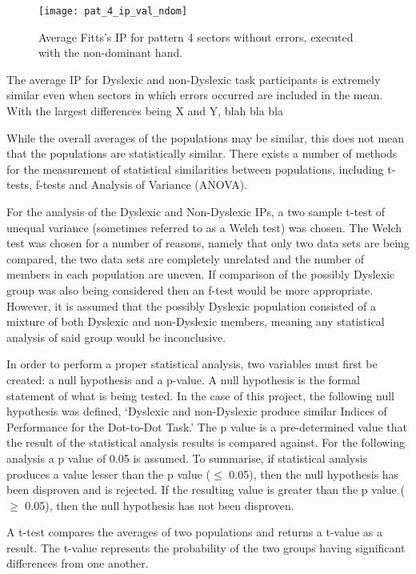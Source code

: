 	\begin{figure}[]
		\centering
		\texttt{[image: pat\_4\_ip\_val\_ndom]}
		\caption{Average Fitts's IP for pattern 4 sectors without errors, executed with the non-dominant hand.}
		\label{fi_pat_4_ip_ndom}
	\end{figure}
			
		The average IP for Dyslexic and non-Dyslexic task participants is extremely similar even when sectors in which errors occurred are included in the mean. With the largest differences being X and Y, blah bla bla

		While the overall averages of the populations may be similar, this does not mean that the populations are statistically similar. There exists a number of methods for the measurement of statistical similarities between populations, including t-tests, f-tests and Analysis of Variance (ANOVA).

		For the analysis of the Dyslexic and Non-Dyslexic IPs, a two sample t-test of unequal variance (sometimes referred to as a Welch test)  was chosen. The Welch test was chosen for a number of reasons, namely that only two data sets are being compared, the two data sets are completely unrelated and the number of members in each population are uneven. If comparison of the possibly Dyslexic group was also being considered then an f-test would be more appropriate. However, it is assumed that the possibly Dyslexic population consisted of a mixture of both Dyslexic and non-Dyslexic members, meaning any statistical analysis of said group would be inconclusive.

		In order to perform a proper statistical analysis, two variables must first be created: a null hypothesis and a p-value. A null hypothesis is the formal statement of what is being tested. In the case of this project, the following null hypothesis was defined,
		‘Dyslexic and non-Dyslexic produce similar Indices of Performance for the Dot-to-Dot Task.’
		The p value is a pre-determined value that the result of the statistical analysis results is compared against. For the following analysis a p value of 0.05 is assumed. To summarise, if statistical analysis produces a value lesser than the p value ($\leq$ 0.05), then the null hypothesis has been disproven and is rejected. If the resulting value is greater than the p value ($\geq$ 0.05), then the null hypothesis has not been disproven.

		A t-test compares the averages of two populations and returns a t-value as a result. The t-value represents the probability of the two groups having significant differences from one  another. 

